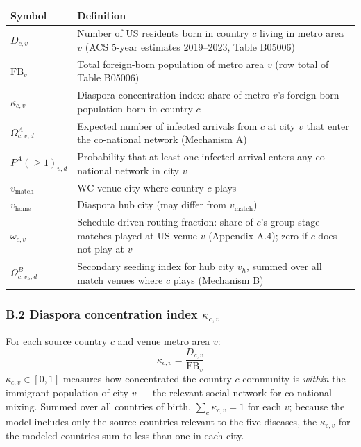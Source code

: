 \documentclass[12pt, a4paper]{article}
\begin{document}
\begin{center}
\small
\begin{tabular}{p{2.8cm} p{9.5cm}}
\toprule
\textbf{Symbol} & \textbf{Definition} \\
\midrule
$D_{c,v}$            & Number of US residents born in country $c$
                       living in metro area $v$
                       (ACS 5-year estimates 2019--2023, Table B05006) \\
$\mathrm{FB}_{v}$    & Total foreign-born population of metro area $v$
                       (row total of Table B05006) \\
$\kappa_{c,v}$       & Diaspora concentration index: share of metro
                       $v$'s foreign-born population born in country $c$ \\
$\Omega^A_{c,v,d}$   & Expected number of infected arrivals from $c$
                       at city $v$ that enter the co-national network
                       (Mechanism A) \\
$P^A(\geq 1)_{v,d}$  & Probability that at least one infected arrival
                       enters any co-national network in city $v$ \\
$v_{\text{match}}$   & WC venue city where country $c$ plays \\
$v_{\text{home}}$    & Diaspora hub city (may differ from
                       $v_{\text{match}}$) \\
$\omega_{c,v}$       & Schedule-driven routing fraction: share of
                       $c$'s group-stage matches played at US venue
                       $v$ (Appendix A.4); zero if $c$ does not play
                       at $v$ \\
$\Omega^B_{c,v_h,d}$ & Secondary seeding index for hub city $v_h$,
                       summed over all match venues where $c$ plays
                       (Mechanism B) \\
\bottomrule
\end{tabular}
\end{center}

\subsubsection*{B.2 Diaspora concentration index $\kappa_{c,v}$}

For each source country $c$ and venue metro area $v$:
\[
  \kappa_{c,v} = \frac{D_{c,v}}{\mathrm{FB}_{v}}
\]
$\kappa_{c,v} \in [0,1]$ measures how concentrated the country-$c$
community is \emph{within} the immigrant population of city $v$ ---
the relevant social network for co-national mixing. Summed over all countries of birth, $\sum_c \kappa_{c,v} = 1$ for each $v$; because the model includes only the source countries relevant to the five diseases, the $\kappa_{c,v}$ for the modeled countries sum to less than one in each city.
\end{document}
